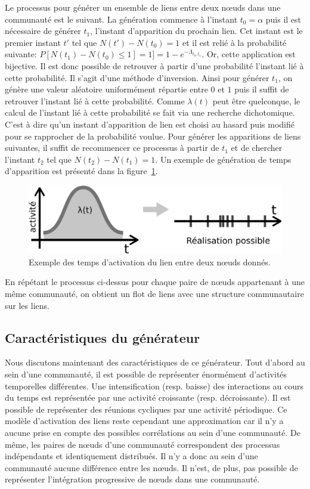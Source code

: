 Le processus pour générer un ensemble de liens entre deux n\oe{}uds dans une communauté est le suivant.
La génération commence à l'instant $t_0=\alpha$ puis il est nécessaire de générer $t_1$, l'instant d'apparition du prochain lien.
Cet instant est le premier instant $t'$ tel que $N(t')- N(t_0)=1$ et il est relié à la probabilité suivante: $P [N(t_1) - N(t_0) \leq 1] = 1]=1-e^{-\Lambda_{t_0,t_1}}$.
Or, cette application est bijective.
Il est donc possible de retrouver à partir d'une probabilité l'instant lié à cette probabilité.
Il s'agit d'une méthode d'inversion.
Ainsi pour générer $t_1$, on génère une valeur aléatoire uniformément répartie entre $0$ et $1$ puis il suffit de retrouver l'instant lié à cette probabilité.
Comme $\lambda(t)$ peut être quelconque, le calcul de l'instant lié à cette probabilité se fait via une recherche dichotomique.
C'est à dire qu'un instant d'apparition de lien est choisi au hasard puis modifié pour se rapprocher de la probabilité voulue.
Pour générer les apparitions de liens suivantes, il suffit de recommencer ce processus à partir de $t_1$ et de chercher l'instant $t_2$ tel que $N(t_2)- N(t_1)=1$.
Un exemple de génération de temps d'apparition est présenté dans la figure~\ref{fig:qualite_Activation}.


\begin{figure}
\centering
\includegraphics[width=0.6\linewidth]{img/Qualite/Activation}
\caption{Exemple des temps d'activation du lien entre deux n\oe{}uds donnés.}
\label{fig:qualite_Activation}
\end{figure}


En répétant le processus ci-dessus pour chaque paire de n\oe{}uds appartenant à une même communauté, on obtient un flot de liens avec une structure communautaire sur les liens.

\subsection{Caractéristiques du générateur}

Nous discutons maintenant des caractéristiques de ce générateur.
Tout d'abord au sein d'une communauté, il est possible de représenter énormément d'activités temporelles différentes.
Une intensification (resp. baisse) des interactions au cours du temps est représentée par une activité croissante (resp. décroissante).
Il est possible de représenter des réunions cycliques par une activité périodique. 
Ce modèle d'activation des liens reste  cependant une approximation car il n'y a aucune prise en compte des possibles corrélations au sein d'une communauté.
De même, les paires de n\oe{}uds d'une communauté correspondent des processus indépendants et identiquement distribués.
Il n'y a donc au sein d'une communauté aucune différence entre les n\oe{}uds.
Il n'est, de plus, pas possible de représenter l'intégration progressive de n\oe{}uds dans une communauté.

